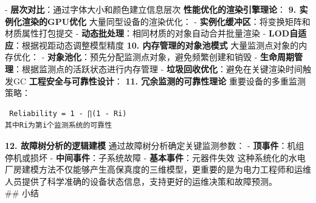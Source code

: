 - \textbf{层次对比}：通过字体大小和颜色建立信息层次 \textbf{性能优化的渲染引擎理论}： \textbf{9. 实例化渲染的GPU优化} 大量同型设备的渲染优化： -
\textbf{实例化缓冲区}：将变换矩阵和材质属性打包提交 - \textbf{动态批处理}：相同材质的对象自动合并批量渲染 - \textbf{LOD自适应}：根据视距动态调整模型精度 \textbf{10. 内存管理的对象池模式}
大量监测点对象的内存优化： - \textbf{对象池化}：预先分配监测点对象，避免频繁创建和销毁 - \textbf{生命周期管理}：根据监测点的活跃状态进行内存管理 - \textbf{垃圾回收优化}：避免在关键渲染时间触发GC
\textbf{工程安全与可靠性设计}： \textbf{11. 冗余监测的可靠性理论} 重要设备的多重监测策略： \begin{lstlisting} Reliability = 1 - ∏(1 - Ri)
其中Ri为第i个监测系统的可靠性 \end{lstlisting} \textbf{12. 故障树分析的逻辑建模} 通过故障树分析确定关键监测参数： - \textbf{顶事件}：机组停机或损坏 - \textbf{中间事件}：子系统故障
- \textbf{基本事件}：元器件失效 这种系统化的水电厂房建模方法不仅能够产生高保真度的三维模型，更重要的是为电力工程师和运维人员提供了科学准确的设备状态信息，支持更好的运维决策和故障预测。 \\\#\# 小结
